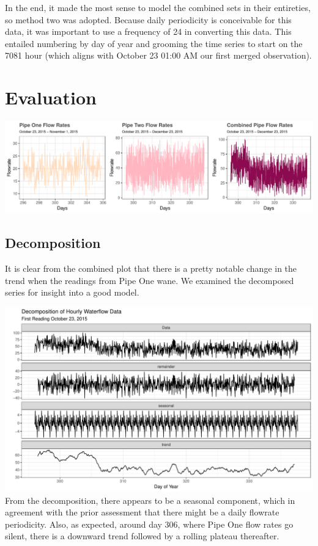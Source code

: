 \documentclass[openany]{book}
\begin{document}
In the end, it made the most sense to model the combined sets in their
entireties, so method two was adopted. Because daily periodicity is
conceivable for this data, it was important to use a frequency of 24 in
converting this data. This entailed numbering by day of year and
grooming the time series to start on the 7081 hour (which aligns with
October 23 01:00 AM our first merged observation).

\hypertarget{evaluation-2}{%
\section{Evaluation}\label{evaluation-2}}

\includegraphics{Group2_Project1_Fall2019_files/figure-latex/unnamed-chunk-14-1.pdf}

\hypertarget{decomposition}{%
\subsection{Decomposition}\label{decomposition}}

It is clear from the combined plot that there is a pretty notable change
in the trend when the readings from Pipe One wane. We examined the
decomposed series for insight into a good model.

\includegraphics{Group2_Project1_Fall2019_files/figure-latex/unnamed-chunk-15-1.pdf}
From the decomposition, there appears to be a seasonal component, which
in agreement with the prior assessment that there might be a daily
flowrate periodicity. Also, as expected, around day 306, where Pipe One
flow rates go silent, there is a downward trend followed by a rolling
plateau thereafter.
\end{document}
